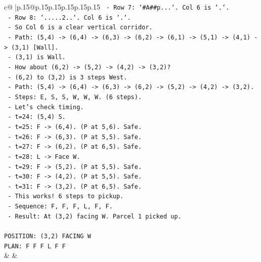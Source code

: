 \documentclass{article}
\begin{document}
{\begin{supertabular}{c@{$\;$}|p{.15\linewidth}@{}p{.15\linewidth}p{.15\linewidth}p{.15\linewidth}p{.15\linewidth}p{.15\linewidth}}
{{{\texttt{       {-} Row 7: `\#A\#\#p...`. Col 6 is `.`.} \\
\texttt{       {-} Row 8: `.....2..`. Col 6 is `.`.} \\
\texttt{       {-} So Col 6 is a clear vertical corridor.} \\
\texttt{       {-} Path: (5,4) {-}> (6,4) {-}> (6,3) {-}> (6,2) {-}> (6,1) {-}> (5,1) {-}> (4,1) {-}> (3,1) {[}Wall{]}.} \\
\texttt{       {-} (3,1) is Wall.} \\
\texttt{       {-} How about (6,2) {-}> (5,2) {-}> (4,2) {-}> (3,2)?} \\
\texttt{       {-} (6,2) to (3,2) is 3 steps West.} \\
\texttt{       {-} Path: (5,4) {-}> (6,4) {-}> (6,3) {-}> (6,2) {-}> (5,2) {-}> (4,2) {-}> (3,2).} \\
\texttt{       {-} Steps: E, S, S, W, W, W. (6 steps).} \\
\texttt{       {-} Let's check timing.} \\
\texttt{       {-} t=24: (5,4) S.} \\
\texttt{       {-} t=25: F {-}> (6,4). (P at 5,6). Safe.} \\
\texttt{       {-} t=26: F {-}> (6,3). (P at 5,5). Safe.} \\
\texttt{       {-} t=27: F {-}> (6,2). (P at 6,5). Safe.} \\
\texttt{       {-} t=28: L {-}> Face W.} \\
\texttt{       {-} t=29: F {-}> (5,2). (P at 5,5). Safe.} \\
\texttt{       {-} t=30: F {-}> (4,2). (P at 5,5). Safe.} \\
\texttt{       {-} t=31: F {-}> (3,2). (P at 6,5). Safe.} \\
\texttt{       {-} This works! 6 steps to pickup.} \\
\texttt{       {-} Sequence: F, F, F, L, F, F.} \\
\texttt{       {-} Result: At (3,2) facing W. Parcel 1 picked up.} \\
\\ 
\texttt{POSITION: (3,2) FACING W} \\
\texttt{PLAN: F F F L F F} \\
            }
        }
    }
    & & \\ \\


\end{supertabular}}
\end{document}
